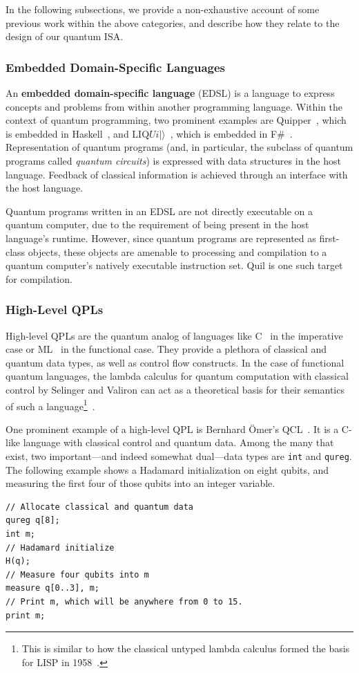 \documentclass[conference]{IEEEtran}
\newcommand{\defn}[1]{\textbf{#1}}
\newcommand{\Liquid}{$\textrm{LIQ}Ui\vert\rangle$}
\begin{document}
In the following subsections, we provide a non-exhaustive account of some previous work within the above categories, and describe how they relate to the design of our quantum ISA.

\subsubsection{Embedded Domain-Specific Languages}
An \defn{embedded domain-specific language} (EDSL) is a language to express concepts and problems from within another programming language. Within the context of quantum programming, two prominent examples are Quipper~\cite{Quipper}, which is embedded in Haskell~\cite{Haskell}, and \Liquid{}~\cite{Liquid}, which is embedded in F\#~\cite{FSharp}. Representation of quantum programs (and, in particular, the subclass of quantum programs called \emph{quantum circuits}) is expressed with data structures in the host language. Feedback of classical information is achieved through an interface with the host language.

Quantum programs written in an EDSL are not directly executable on a quantum computer, due to the requirement of being present in the host language's runtime. However, since quantum programs are represented as first-class objects, these objects are amenable to processing and compilation to a quantum computer's natively executable instruction set. Quil is one such target for compilation.

\subsubsection{High-Level QPLs}

High-level QPLs are the quantum analog of languages like C~\cite{kandr} in the imperative case or ML~\cite{stdml} in the functional case. They provide a plethora of classical and quantum data types, as well as control flow constructs. In the case of functional quantum languages, the lambda calculus for quantum computation with classical control by Selinger and Valiron can act as a theoretical basis for their semantics of such a language\footnote{This is similar to how the classical untyped lambda calculus formed the basis for LISP in 1958~\cite{mccarthy1960recursive}.}~\cite{selinger2006lambda}.

One prominent example of a high-level QPL is Bernhard \"Omer's QCL~\cite{OmerB:strqp}. It is a C-like language with classical control and quantum data. Among the many that exist, two important---and indeed somewhat dual---data types are \verb|int| and \verb|qureg|. The following example shows a Hadamard initialization on eight qubits, and measuring the first four of those qubits into an integer variable.
\begin{verbatim}
// Allocate classical and quantum data
qureg q[8];
int m;
// Hadamard initialize
H(q);
// Measure four qubits into m
measure q[0..3], m;
// Print m, which will be anywhere from 0 to 15.
print m;
\end{verbatim}
\end{document}
